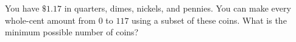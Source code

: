 You have $\$1.17$ in quarters, dimes, nickels, and pennies. You can make every whole-cent amount from $0$ to $117$ using a subset of these coins. What is the minimum possible number of coins?
